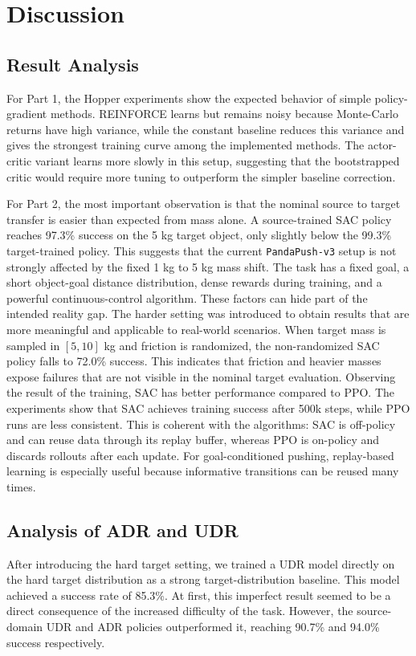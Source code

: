 \section{Discussion}
\subsection{Result Analysis}
For Part 1, the Hopper experiments show the expected behavior of simple policy-gradient methods. REINFORCE learns but remains noisy because Monte-Carlo returns have high variance, while the constant baseline reduces this variance and gives the strongest training curve among the implemented methods. The actor-critic variant learns more slowly in this setup, suggesting that the bootstrapped critic would require more tuning to outperform the simpler baseline correction.

For Part 2, the most important observation is that the nominal source to target transfer is easier than expected from mass alone. A source-trained SAC policy reaches 97.3\% success on the 5 kg target object, only slightly below the 99.3\% target-trained policy. This suggests that the current \texttt{PandaPush-v3} setup is not strongly affected by the fixed 1 kg to 5 kg mass shift. The task has a fixed goal, a short object-goal distance distribution, dense rewards during training, and a powerful continuous-control algorithm. These factors can hide part of the intended reality gap.
The harder setting was introduced to obtain results that are more meaningful and applicable to real-world scenarios.
When target mass is sampled in $[5,10]$ kg and friction is randomized, the non-randomized SAC policy falls to 72.0\% success. This indicates that friction and heavier masses expose failures that are not visible in the nominal target evaluation.
Observing the result of the training, SAC has better performance compared to PPO. The experiments show that SAC achieves training success after 500k steps, while PPO runs are less consistent. This is coherent with the algorithms: SAC is off-policy and can reuse data through its replay buffer, whereas PPO is on-policy and discards rollouts after each update. For goal-conditioned pushing, replay-based learning is especially useful because informative transitions can be reused many times.

\subsection{Analysis of ADR and UDR}
After introducing the hard target setting, we trained a UDR model directly on the hard target distribution as a strong target-distribution baseline. This model achieved a success rate of 85.3\%. At first, this imperfect result seemed to be a direct consequence of the
increased difficulty of the task. However, the source-domain UDR and ADR policies outperformed it, reaching 90.7\% and 94.0\% success respectively.

